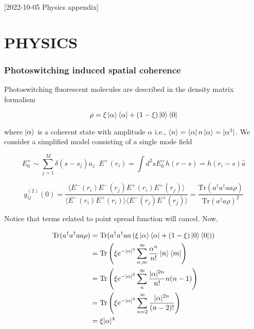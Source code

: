 [2022-10-05 Physics appendix]

\chapter{PHYSICS}

\subsection{Photoswitching induced spatial coherence}

Photoswitching fluorescent molecules are described in the density matrix formalism

\begin{equation*}
\rho = \xi\ket{\alpha}\bra{\alpha} + (1-\xi)\ket{0}\bra{0}
\end{equation*}

where $\ket{\alpha}$ is a coherent state with amplitude $\alpha$ i.e., $\langle n\rangle = \bra{\alpha} n\ket{\alpha} = \lvert\alpha^{2}\rvert$. We consider a simplified model consisting of a single mode field 

\begin{equation*}
E_{0}^{+}\sim \sum_{j=1}^{M}\delta(s-s_{j})a_{j} \;\; E^{+}(r_{i}) = \int d^{2}s E_{0}^{+} h(r-s) = h(r_{i}-s)\hat{a}
\end{equation*}

\begin{equation*}
g^{(2)}_{ij}(0) = \frac{\langle E^{-}(r_{i})E^{-}(r_{j})E^{+}(r_{i})E^{+}(r_{j}) \rangle}{\langle E^{-}(r_{i})E^{+}(r_{i})\rangle\langle E^{-}(r_{j})E^{+}(r_{j})\rangle} = \frac{\mathrm{Tr}(a^{\dagger}a^{\dagger}aa\rho)}{\mathrm{Tr}(a^{\dagger}a\rho)^{2}}
\end{equation*}

Notice that terms related to point spread function will cancel. Now,

\begin{align*}
\mathrm{Tr}(a^{\dagger}a^{\dagger}aa\rho) &= \mathrm{Tr}(a^{\dagger}a^{\dagger}aa \left(\xi\ket{\alpha}\bra{\alpha} + (1-\xi)\ket{0}\bra{0}\right))\\
&= \mathrm{Tr}\left(\xi e^{-\lvert\alpha\rvert^{2}}\sum_{n,m}^{\infty}\frac{\alpha^{n}}{n!}\ket{n}\bra{m}\right)\\
&= \mathrm{Tr}\left(\xi e^{-\lvert\alpha\rvert^{2}}\sum_{n}^{\infty}\frac{\lvert\alpha\rvert^{2n}}{n!}n(n-1)\right)\\
&= \mathrm{Tr}\left(\xi e^{-\lvert\alpha\rvert^{2}}\sum_{n=2}^{\infty}\frac{\lvert\alpha\rvert^{2n}}{(n-2)!}\right)\\
&= \xi\lvert\alpha\rvert^{4}
\end{align*}

